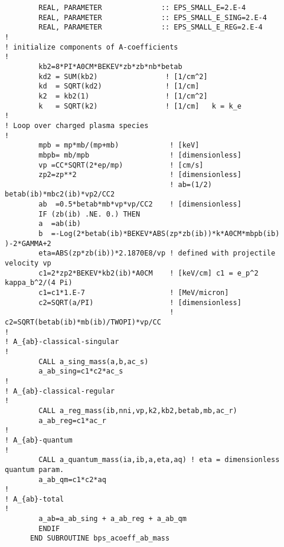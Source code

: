 \documentclass[preprint,12pt,eqsecnum,nofootinbib,amsmath,amssymb]{revtex4}
\begin{document}
{\begin{verbatim}
        REAL, PARAMETER              :: EPS_SMALL_E=2.E-4
        REAL, PARAMETER              :: EPS_SMALL_E_SING=2.E-4
        REAL, PARAMETER              :: EPS_SMALL_E_REG=2.E-4
!
! initialize components of A-coefficients
!
        kb2=8*PI*A0CM*BEKEV*zb*zb*nb*betab
        kd2 = SUM(kb2)                ! [1/cm^2]
        kd  = SQRT(kd2)               ! [1/cm]
        k2  = kb2(1)                  ! [1/cm^2]
        k   = SQRT(k2)                ! [1/cm]   k = k_e
!
! Loop over charged plasma species
!
        mpb = mp*mb/(mp+mb)            ! [keV]
        mbpb= mb/mpb                   ! [dimensionless]
        vp =CC*SQRT(2*ep/mp)           ! [cm/s]
        zp2=zp**2                      ! [dimensionless]
                                       ! ab=(1/2) betab(ib)*mbc2(ib)*vp2/CC2
        ab  =0.5*betab*mb*vp*vp/CC2    ! [dimensionless] 
        IF (zb(ib) .NE. 0.) THEN
        a  =ab(ib)
        b  =-Log(2*betab(ib)*BEKEV*ABS(zp*zb(ib))*k*A0CM*mbpb(ib) )-2*GAMMA+2
        eta=ABS(zp*zb(ib))*2.1870E8/vp ! defined with projectile velocity vp
        c1=2*zp2*BEKEV*kb2(ib)*A0CM    ! [keV/cm] c1 = e_p^2 kappa_b^2/(4 Pi)
        c1=c1*1.E-7                    ! [MeV/micron]  
        c2=SQRT(a/PI)                  ! [dimensionless] 
                                       ! c2=SQRT(betab(ib)*mb(ib)/TWOPI)*vp/CC 
!
! A_{ab}-classical-singular 
!
        CALL a_sing_mass(a,b,ac_s) 
        a_ab_sing=c1*c2*ac_s
!
! A_{ab}-classical-regular 
!
        CALL a_reg_mass(ib,nni,vp,k2,kb2,betab,mb,ac_r)
        a_ab_reg=c1*ac_r
!
! A_{ab}-quantum
!
        CALL a_quantum_mass(ia,ib,a,eta,aq) ! eta = dimensionless quantum param.
        a_ab_qm=c1*c2*aq
!
! A_{ab}-total
!
        a_ab=a_ab_sing + a_ab_reg + a_ab_qm
        ENDIF
      END SUBROUTINE bps_acoeff_ab_mass
\end{verbatim}
}
\end{document}

